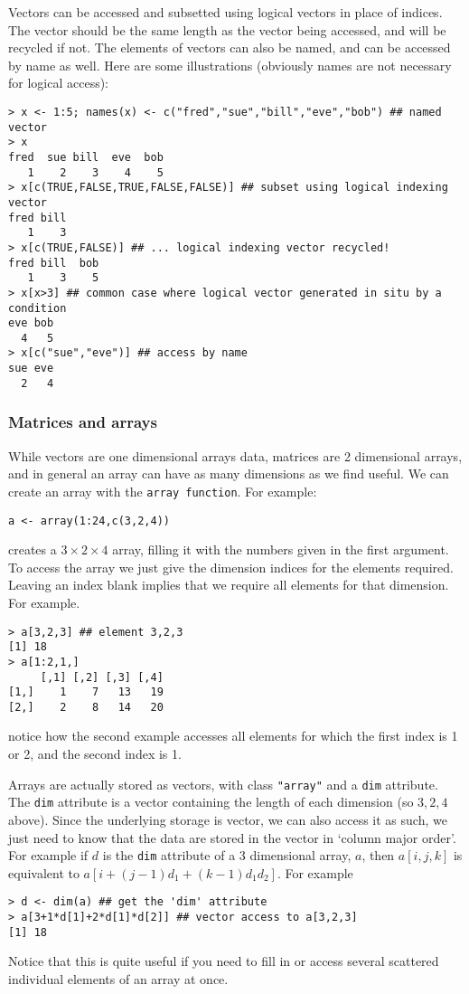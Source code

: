 \documentclass[10pt] {article}
\theoremstyle{definition}
\begin{document}
Vectors can be accessed and subsetted using logical vectors in place of indices. The vector should be the same length as the vector being accessed, and will be recycled if not. The elements of vectors can also be named, and can be accessed by name as well. Here are some illustrations (obviously names are not necessary for logical access):
\begin{lstlisting}
> x <- 1:5; names(x) <- c("fred","sue","bill","eve","bob") ## named vector
> x
fred  sue bill  eve  bob 
   1    2    3    4    5 
> x[c(TRUE,FALSE,TRUE,FALSE,FALSE)] ## subset using logical indexing vector
fred bill 
   1    3 
> x[c(TRUE,FALSE)] ## ... logical indexing vector recycled!
fred bill  bob 
   1    3    5 
> x[x>3] ## common case where logical vector generated in situ by a condition 
eve bob 
  4   5 
> x[c("sue","eve")] ## access by name
sue eve 
  2   4 
\end{lstlisting}

\subsubsection{Matrices and arrays}

While vectors are one dimensional arrays data, matrices are 2 dimensional arrays, and in general an array can have as many dimensions as we find useful. We can create an array with the {\tt array function}. For example:
\begin{lstlisting}
a <- array(1:24,c(3,2,4))
\end{lstlisting}
creates a $3 \times 2 \times 4$ array, filling it with the numbers given in the first argument. To access the array we just give the dimension indices for the elements required. Leaving an index blank implies that we require all elements for that dimension. For example.
\begin{verbatim}
> a[3,2,3] ## element 3,2,3
[1] 18
> a[1:2,1,] 
     [,1] [,2] [,3] [,4]
[1,]    1    7   13   19
[2,]    2    8   14   20
\end{verbatim}  
notice how the second example accesses all elements for which the first index is 1 or 2, and the second index is 1.

Arrays are actually stored as vectors, with class \lstinline+"array"+ and a {\tt dim} attribute. The {\tt dim} attribute is a vector containing the length of each dimension (so $3,2,4$ above). Since the underlying storage is vector, we can also access it as such, we just need to know that the data are stored in the vector in `column major order'. For example if $d$ is the {\tt dim} attribute of a 3 dimensional array, $a$, then $a[i,j,k]$ is equivalent to $a[i + (j-1)d_1 + (k-1)d_1d_2]$. For example 
\begin{lstlisting}
> d <- dim(a) ## get the 'dim' attribute
> a[3+1*d[1]+2*d[1]*d[2]] ## vector access to a[3,2,3]
[1] 18
\end{lstlisting}
Notice that this is quite useful if you need to fill in or access several scattered individual elements of an array at once.
\end{document}
